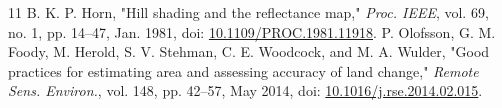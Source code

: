 \documentclass[journal]{IEEEtran}
\begin{document}
\begin{thebibliography}{11}
B. K. P. Horn, "Hill shading and the reflectance map," \emph{Proc. IEEE}, vol. 69, no. 1, pp. 14--47, Jan. 1981, doi: \href{https://doi.org/10.1109/PROC.1981.11918}{10.1109/PROC.1981.11918}.
P. Olofsson, G. M. Foody, M. Herold, S. V. Stehman, C. E. Woodcock, and M. A. Wulder, "Good practices for estimating area and assessing accuracy of land change," \emph{Remote Sens. Environ.}, vol. 148, pp. 42--57, May 2014, doi: \href{https://doi.org/10.1016/j.rse.2014.02.015}{10.1016/j.rse.2014.02.015}.
\end{thebibliography}
\end{document}
